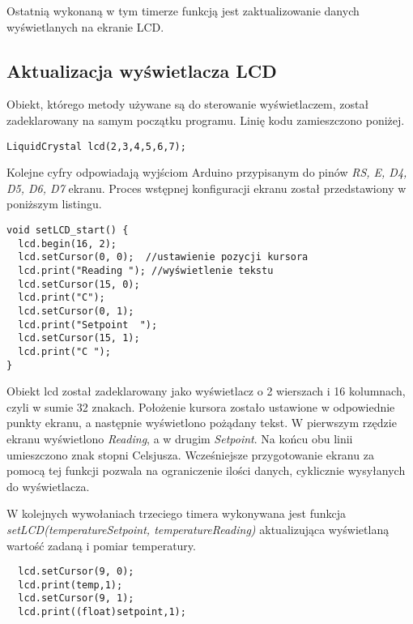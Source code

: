 Ostatnią wykonaną w tym timerze funkcją jest zaktualizowanie danych wyświetlanych na ekranie LCD.
\subsection{Aktualizacja wyświetlacza LCD} %
Obiekt, którego metody używane są do sterowanie wyświetlaczem, został zadeklarowany na samym początku programu. Linię kodu zamieszczono poniżej.
\begin{lstlisting}
LiquidCrystal lcd(2,3,4,5,6,7);
\end{lstlisting}
Kolejne cyfry odpowiadają wyjściom Arduino przypisanym do pinów \textit{RS, E, D4, D5, D6, D7} ekranu.
Proces wstępnej konfiguracji ekranu został przedstawiony w poniższym listingu.
\begin{lstlisting}
void setLCD_start() {
  lcd.begin(16, 2);
  lcd.setCursor(0, 0);	//ustawienie pozycji kursora
  lcd.print("Reading "); //wyświetlenie tekstu
  lcd.setCursor(15, 0);
  lcd.print("C");
  lcd.setCursor(0, 1);
  lcd.print("Setpoint  ");
  lcd.setCursor(15, 1);
  lcd.print("C ");
}
\end{lstlisting}
Obiekt lcd został zadeklarowany jako wyświetlacz o 2 wierszach i 16 kolumnach, czyli w sumie 32 znakach. Położenie kursora zostało ustawione w odpowiednie punkty ekranu, a następnie wyświetlono pożądany tekst. W pierwszym rzędzie ekranu wyświetlono \textit{Reading}, a w drugim \textit{Setpoint}. Na końcu obu linii umieszczono znak stopni Celsjusza. Wcześniejsze przygotowanie ekranu za pomocą tej funkcji pozwala na ograniczenie ilości danych, cyklicznie wysyłanych do wyświetlacza.

W kolejnych wywołaniach trzeciego timera wykonywana jest funkcja \textit{setLCD(temperatureSetpoint, temperatureReading)} aktualizująca wyświetlaną wartość zadaną i pomiar temperatury.
\begin{lstlisting}
  lcd.setCursor(9, 0);
  lcd.print(temp,1);
  lcd.setCursor(9, 1);
  lcd.print((float)setpoint,1);
\end{lstlisting}